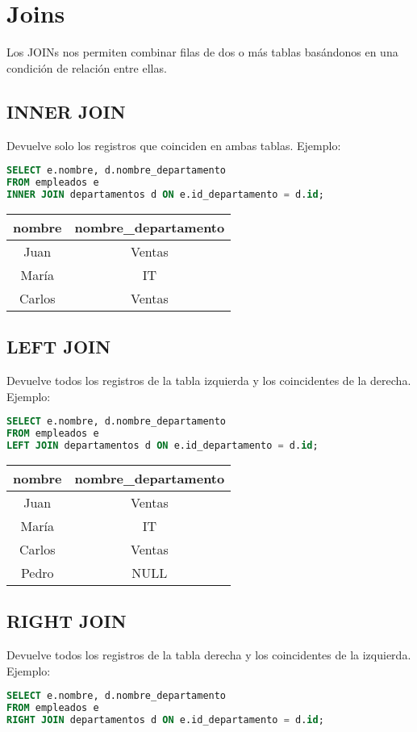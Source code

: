 \documentclass[12pt]{article}
\begin{document}
\section{Joins}
Los JOINs nos permiten combinar filas de dos o más tablas basándonos en una condición de relación entre ellas.

\subsection{INNER JOIN}
Devuelve solo los registros que coinciden en ambas tablas. Ejemplo:
\begin{lstlisting}[language=SQL]
SELECT e.nombre, d.nombre_departamento
FROM empleados e
INNER JOIN departamentos d ON e.id_departamento = d.id;
\end{lstlisting}

\begin{center}
\begin{tabular}{cc}
\toprule
nombre & nombre\_departamento \\
\midrule
Juan & Ventas \\
María & IT \\
Carlos & Ventas \\
\bottomrule
\end{tabular}
\end{center}

\subsection{LEFT JOIN}
Devuelve todos los registros de la tabla izquierda y los coincidentes de la derecha. Ejemplo:
\begin{lstlisting}[language=SQL]
SELECT e.nombre, d.nombre_departamento
FROM empleados e
LEFT JOIN departamentos d ON e.id_departamento = d.id;
\end{lstlisting}

\begin{center}
\begin{tabular}{cc}
\toprule
nombre & nombre\_departamento \\
\midrule
Juan & Ventas \\
María & IT \\
Carlos & Ventas \\
Pedro & NULL \\
\bottomrule
\end{tabular}
\end{center}

\subsection{RIGHT JOIN}
Devuelve todos los registros de la tabla derecha y los coincidentes de la izquierda. Ejemplo:
\begin{lstlisting}[language=SQL]
SELECT e.nombre, d.nombre_departamento
FROM empleados e
RIGHT JOIN departamentos d ON e.id_departamento = d.id;
\end{lstlisting}
\end{document}
